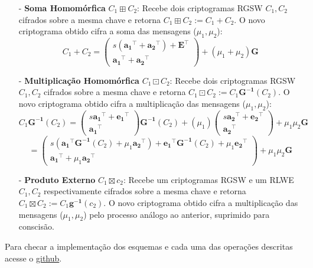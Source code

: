 \begin{itemize}
    \item[-] \textbf{Soma Homomórfica} $C_1 \boxplus C_2 $: Recebe dois criptogramas RGSW $C_1, C_2$ cifrados sobre a mesma chave e retorna $C_1 \boxplus C_2 := C_1 + C_2$. 
    O novo criptograma obtido cifra a soma das mensagens ($\mu_1, \mu_2$):
    $$
    C_1 + C_2 = \begin{pmatrix} s (\mathbf{a_1}^\top + \mathbf{a_2}^\top) + \mathbf{E}^\top \\ \mathbf{a_1}^\top + \mathbf{a_2}^\top \end{pmatrix} + (\mu_1 + \mu_2) \mathbf{G}
    $$
    \item[-] \textbf{Multiplicação Homomórfica} $C_1 \boxdot C_2$: Recebe dois criptogramas RGSW $C_1, C_2$ cifrados sobre a mesma chave e retorna $C_1 \boxdot C_2 := C_1 \mathbf{G^{-1}}(C_2)$. 
    O novo criptograma obtido cifra a multiplicação das mensagens ($\mu_1, \mu_2$): 
    $$
    C_1 \mathbf{G^{-1}}(C_2) = \begin{pmatrix} s \mathbf{a_1}^\top + \mathbf{e_1}^\top \\ \mathbf{a_1}^\top \end{pmatrix} \mathbf{G^{-1}}(C_2)  + (\mu_1) \begin{pmatrix} s \mathbf{a_2}^\top + \mathbf{e_2}^\top \\ \mathbf{a_2}^\top \end{pmatrix} + \mu_1 \mu_2 \mathbf{G}
    $$
    $$
        = \begin{pmatrix} s (\mathbf{a_1}^\top \mathbf{G^{-1}}(C_2) + \mu_1 \mathbf{a_2}^\top) + \mathbf{e_1}^\top \mathbf{G^{-1}}(C_2) + \mu_1 \mathbf{e_2}^\top \\ \mathbf{a_1}^\top + \mu_1 \mathbf{a_2}^\top \end{pmatrix}  + \mu_1 \mu_2 \mathbf{G}
    $$
    \item[-] \textbf{Produto Externo} $C_1 \boxtimes c_2 $: Recebe um criptogramas RGSW e um RLWE $C_1, C_2$ respectivamente cifrados sobre a mesma chave e retorna $C_1 \boxtimes C_2 := C_1 \mathbf{g^{-1}}(c_2)$. 
    O novo criptograma obtido cifra a multiplicação das mensagens ($\mu_1, \mu_2$) pelo processo análogo ao anterior, suprimido para conscisão.
\end{itemize}

Para checar a implementação dos esquemas e cada uma das operações descritas acesse o \href{https://github.com/gustavoesteche/ic-bootstraping/tree/main/src_sage/dual}{github}.
